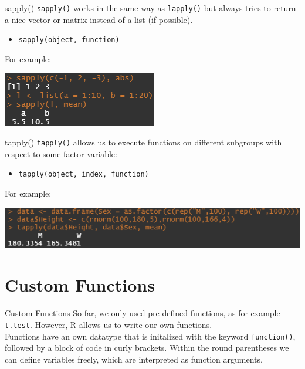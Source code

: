 \documentclass[xcolor=dvipsnames, aspectratio = 169]{beamer}
\begin{document}
\begin{frame}[fragile]{sapply()}
	\verb+sapply()+ works in the same way as \verb+lapply()+ but always tries to return a nice vector or matrix instead of a list (if possible).
	\begin{itemize}
		\item \verb+sapply(object, function)+
	\end{itemize}
	For example:\\
	\begin{center}
		\includegraphics{sapply}
	\end{center}
\end{frame}

\begin{frame}[fragile]{tapply()}
	\verb+tapply()+ allows us to execute functions on different subgroups with respect to some factor variable:
	\begin{itemize}
		\item \verb+tapply(object, index, function)+
	\end{itemize}
	For example:\\
	\begin{center}
		\includegraphics{tapply}
	\end{center}
\end{frame}

\section{Custom Functions}

\begin{frame}[fragile]{Custom Functions}
    So far, we only used pre-defined functions, as for example \verb+t.test+. However, \textsf R allows us to write our own functions. \bigskip \\
Functions have an own datatype that is initalized with the keyword \verb+function()+, followed by a block of code in curly brackets. Within the round parentheses we can define variables freely, which are interpreted as function arguments.
\end{frame}
\end{document}
